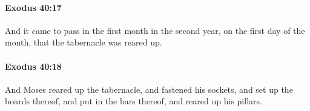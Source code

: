 		\paragraph{Exodus 40:17} %
			\label{EXODUS-40-17}

			And it came to pass in the first month in the second year, on the first day of the month, that the tabernacle was reared up.


		\paragraph{Exodus 40:18} %
			\label{EXODUS-40-18}

			And Moses reared up the tabernacle, and fastened his sockets, and set up the boards thereof, and put in the bars thereof, and reared up his pillars.


